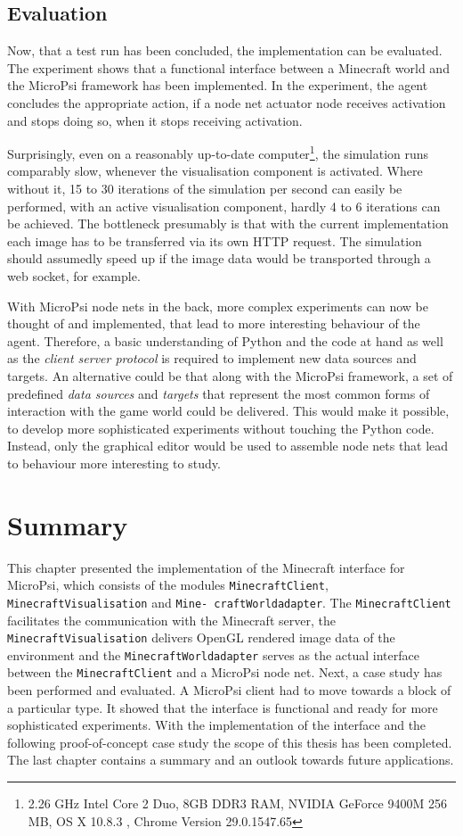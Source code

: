         \subsection{Evaluation}
        
Now, that a test run has been concluded, the implementation can be evaluated.
The experiment shows that a functional interface between a Minecraft world and the MicroPsi framework has been implemented. In the experiment, the agent concludes the appropriate action, if a node net actuator node receives activation and stops doing so, when it stops receiving activation.

Surprisingly, even on a reasonably up-to-date computer\footnote{2.26 GHz Intel Core 2 Duo, 8GB DDR3 RAM, NVIDIA GeForce 9400M 256 MB, OS X 10.8.3 , Chrome Version 29.0.1547.65}, the simulation runs comparably slow, whenever the visualisation component is activated. Where without it, 15 to 30 iterations of the simulation per second can easily be performed, with an active visualisation component, hardly 4 to 6 iterations can be achieved. The bottleneck presumably is that with the current implementation each image has to be transferred via its own HTTP request. The simulation should assumedly speed up if the image data would be transported through a web socket, for example.

With MicroPsi node nets in the back, more complex experiments can now be thought of and implemented, that lead to more interesting behaviour of the agent. Therefore, a basic understanding of Python and the code at hand as well as the \emph{client server protocol} is required to implement new data sources and targets. An alternative could be that along with the MicroPsi framework, a set of predefined \emph{data sources} and \emph{targets} that represent the most common forms of interaction with the game world could be delivered. This would make it possible, to develop more sophisticated experiments without touching the Python code. Instead, only the graphical editor would be used to assemble node nets that lead to behaviour more interesting to study.

    \section{Summary}
This chapter presented the implementation of the Minecraft interface for MicroPsi, which consists of the modules \texttt{MinecraftClient}, \texttt{MinecraftVisualisation} and \texttt{Mine- craftWorldadapter}. The \texttt{MinecraftClient} facilitates the communication with the Minecraft server, the \texttt{MinecraftVisualisation} delivers OpenGL rendered image data of the environment and the \texttt{MinecraftWorldadapter} serves as the actual interface between the \texttt{MinecraftClient} and a MicroPsi node net.
Next, a case study has been performed and evaluated. A MicroPsi client had to move towards a block of a particular type. It showed that the interface is functional and ready for more sophisticated experiments.
With the implementation of the interface and the following proof-of-concept case study the scope of this thesis has been completed. The last chapter contains a summary and an outlook towards future applications.